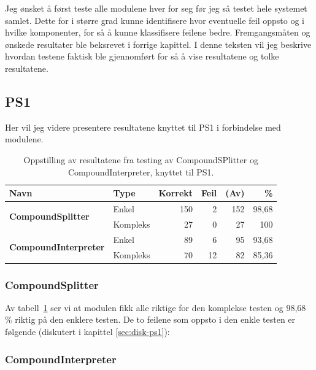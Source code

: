 Jeg ønsket å først teste alle modulene hver for seg før jeg så testet hele systemet samlet. Dette for i større grad kunne identifisere hvor eventuelle feil oppsto og i hvilke komponenter, for så å kunne klassifisere feilene bedre. Fremgangsmåten og ønskede resultater ble beksrevet i forrige kapittel. I denne teksten vil jeg beskrive hvordan testene faktisk ble gjennomført for så å vise resultatene og tolke resultatene.

\subsection{PS1}

Her vil jeg videre presentere resultatene knyttet til PS1 i forbindelse med modulene.

\begin{table}[h]
	\centering 
	\begin{tabular}{llrrrr} \hline 
		\textbf{Navn} & \textbf{Type} & \textbf{Korrekt} & \textbf{Feil} & \textbf{(Av)} & \textbf{\%} \\
		\hline \multirow{2}{*}{\textbf{CompoundSplitter}} & Enkel & 150 & 2 & 152 & 98,68 \\
		\cline{2-6} & Kompleks & 27 & 0 & 27 & 100 \\
		\hline \multirow{2}{*}{\textbf{CompoundInterpreter}} & Enkel & 89 & 6 & 95 & 93,68 \\
		\cline{2-6} & Kompleks & 70 & 12 & 82 & 85,36 \\
		\hline 
	\end{tabular}
	\caption{Oppstilling av resultatene fra testing av CompoundSPlitter og CompoundInterpreter, knyttet til PS1.} \label{tab:module-test} 
\end{table}

\subsubsection{CompoundSplitter}

Av tabell~\ref{tab:module-test} ser vi at modulen fikk alle riktige for den komplekse testen og 98,68 \% riktig på den enklere testen. De to feilene som oppsto i den enkle testen er følgende (diskutert i kapittel \ref{sec:disk-ps1}):

\newline
{}

\subsubsection{CompoundInterpreter}

